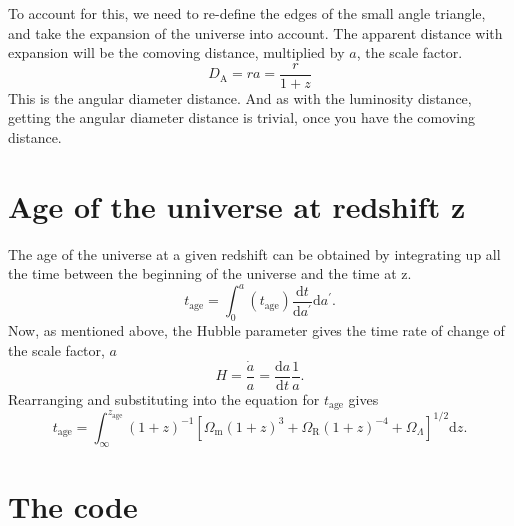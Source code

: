 \documentclass[]{article}
\begin{document}
\noindent To account for this, we need to re-define the edges of the small angle triangle, and take the expansion of the universe into account. The apparent distance with expansion will be the comoving distance, multiplied by $a$, the scale factor. 
\begin{equation}
D_\mathrm{A} = r a = \frac{r}{1+z}
\end{equation}
This is the angular diameter distance. And as with the luminosity distance, getting the angular diameter distance is trivial, once you have the comoving distance. 

\section{Age of the universe at redshift z}

The age of the universe at a given redshift can be obtained by integrating up all the time between the beginning of the universe and the time at z. 
\begin{equation}
t_\mathrm{age} = \int_0^a(t_\mathrm{age}) \frac{\mathrm{d}t}{\mathrm{d}a^\prime} \mathrm{d}a^\prime.
\end{equation}
Now, as mentioned above, the Hubble parameter gives the time rate of change of the scale factor, $a$
\begin{equation}
H = \frac{\dot a}{a} = \frac{\mathrm{d}a}{\mathrm{d}t}\frac{1}{a}.
\end{equation}
Rearranging and substituting into the equation for $t_\mathrm{age}$ gives 
\begin{equation}
t_\mathrm{age} = \int_\infty^{z_\mathrm{age}} (1+z)^{-1} [\Omega_\mathrm{m} (1+z)^{3}+\Omega_\mathrm{R} (1+z)^{-4}+\Omega_\Lambda]^{1/2} \mathrm{d}z.
\end{equation}

\section{The code}
\end{document}
